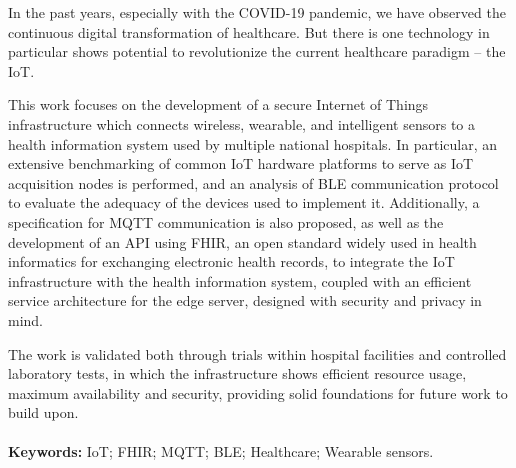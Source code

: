 
\vspace{1cm}
\noindent

In the past years, especially with the COVID-19 pandemic, we have observed the continuous digital transformation of healthcare. But there is one technology in particular shows potential to revolutionize the current healthcare paradigm -- the \acf{IoT}. 

This work focuses on the development of a secure Internet of Things infrastructure which connects wireless, wearable, and intelligent sensors to a health information system used by multiple national hospitals. In particular, an extensive benchmarking of common IoT hardware platforms to serve as \acs{IoT} acquisition nodes is performed, and an analysis of \acf{BLE} communication protocol to evaluate the adequacy of the devices used to implement it. Additionally, a specification for \acf{MQTT} communication is also proposed, as well as the development of an \acf{API} using \acf{FHIR}, an open standard widely used in health informatics for exchanging electronic health records, to integrate the IoT infrastructure with the health information system, coupled with an efficient service architecture for the edge server, designed with security and privacy in mind. 

The work is validated both through trials within hospital facilities and controlled laboratory tests, in which the infrastructure shows efficient resource usage, maximum availability and security, providing solid foundations for future work to build upon.

\paragraph{}\textbf{Keywords:} \acl{IoT}; \acs{FHIR}; \acs{MQTT}; \acl{BLE}; Healthcare; Wearable sensors.
